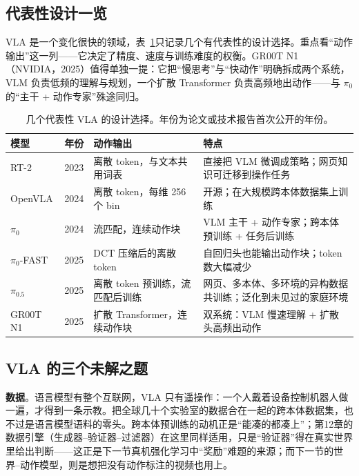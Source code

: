 \subsection{代表性设计一览}

VLA 是一个变化很快的领域，表~\ref{tab:vla_compare}只记录几个有代表性的设计选择。重点看“动作输出”这一列——它决定了精度、速度与训练难度的权衡。GR00T N1（NVIDIA，2025）值得单独一提：它把“慢思考”与“快动作”明确拆成两个系统，VLM 负责低频的理解与规划，一个扩散 Transformer 负责高频地出动作——与 $\pi_0$ 的“主干 + 动作专家”殊途同归。

\begin{table}[htbp]
\centering
\small
\renewcommand{\arraystretch}{1.3}
\setlength{\tabcolsep}{4pt}
\begin{tabular}{p{2.0cm}p{0.9cm}p{3.4cm}p{5.3cm}}
\toprule
\textbf{模型} & \textbf{年份} & \textbf{动作输出} & \textbf{特点} \\
\midrule
RT-2 & 2023 & 离散 token，与文本共用词表 & 直接把 VLM 微调成策略；网页知识可迁移到操作任务 \\
OpenVLA & 2024 & 离散 token，每维 256 个 bin & 开源；在大规模跨本体数据集上训练 \\
$\pi_0$ & 2024 & 流匹配，连续动作块 & VLM 主干 + 动作专家；跨本体预训练 + 任务后训练 \\
$\pi_0$-FAST & 2025 & DCT 压缩后的离散 token & 自回归头也能输出动作块；token 数大幅减少 \\
$\pi_{0.5}$ & 2025 & 离散 token 预训练，流匹配后训练 & 网页、多本体、多环境的异构数据共训练；泛化到未见过的家庭环境 \\
GR00T N1 & 2025 & 扩散 Transformer，连续动作块 & 双系统：VLM 慢速理解 + 扩散头高频出动作 \\
\bottomrule
\end{tabular}
\caption{几个代表性 VLA 的设计选择。年份为论文或技术报告首次公开的年份。}
\label{tab:vla_compare}
\end{table}

\subsection{VLA 的三个未解之题}

\textbf{数据}。语言模型有整个互联网，VLA 只有遥操作：一个人戴着设备控制机器人做一遍，才得到一条示教。把全球几十个实验室的数据合在一起的跨本体数据集，也不过是语言模型语料的零头。跨本体预训练的动机正是“能凑的都凑上”；第12章的数据引擎（生成器--验证器--过滤器）在这里同样适用，只是“验证器”得在真实世界里给出判断——这正是下一节真机强化学习中“奖励”难题的来源；而下一节的世界--动作模型，则是想把没有动作标注的视频也用上。

